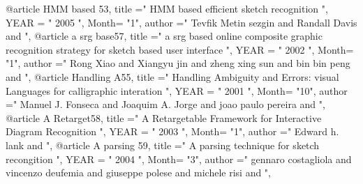 @article{ HMM based 53, 
  title ="  HMM based efficient sketch recognition  ", 
 YEAR = " 2005  ",
Month= "1",
 author =" Tevfik Metin sezgin   and  Randall Davis   and  ",
}
@article{ a srg base57, 
  title ="  a srg based online composite graphic recognition strategy for sketch based user interface  ", 
 YEAR = " 2002  ",
Month= "1",
 author =" Rong Xiao   and  Xiangyu jin   and  zheng xing sun   and  bin bin peng   and  ",
}
@article{ Handling A55, 
  title ="  Handling Ambiguity and Errors: visual Languages for calligraphic interation   ", 
 YEAR = " 2001  ",
Month= "10",
 author =" Manuel J. Fonseca   and  Joaquim A. Jorge   and  joao  paulo pereira   and  ",
}
@article{ A Retarget58, 
  title ="  A Retargetable Framework for Interactive Diagram Recognition  ", 
 YEAR = " 2003  ",
Month= "1",
 author =" Edward h. lank   and  ",
}
@article{ A parsing 59, 
  title ="  A parsing technique for sketch recongition  ", 
 YEAR = " 2004  ",
Month= "3",
 author =" gennaro costagliola   and  vincenzo deufemia   and  giuseppe polese   and  michele risi   and  ",
}
